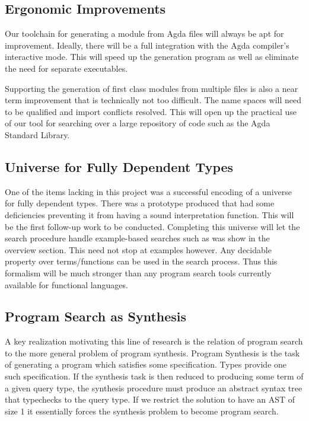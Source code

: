 \documentclass[acmsmall,review,authorversion]{acmart}
\newcommand{\?}{\stackrel{?}{\approx}}
\begin{document}
\subsection{Ergonomic Improvements}

Our toolchain for generating a module from Agda files will always be apt for
improvement. Ideally, there will be a full integration with the Agda compiler's
interactive mode. This will speed up the generation program as well as eliminate
the need for separate executables.

Supporting the generation of first class modules from multiple files is also a
near term improvement that is technically not too difficult. The name spaces
will need to be qualified and import conflicts resolved. This will open up the
practical use of our tool for searching over a large repository of code such as
the Agda Standard Library.\cite{bove2009brief} 


\subsection{Universe for Fully Dependent Types}

One of the items lacking in this project was a successful encoding of a universe
for fully dependent types. There was a prototype produced that had some
deficiencies preventing it from having a sound interpretation function. This
will be the first follow-up work to be conducted. Completing this universe will
let the search procedure handle example-based searches such as was show in the
overview section. This need not stop at examples however. Any decidable property
over terms/functions can be used in the search process. Thus this formalism will
be much stronger than any program search tools currently available for
functional languages.

\subsection{Program Search as Synthesis}

A key realization motivating this line of research is the relation of program
search to the more general problem of program synthesis. Program Synthesis is
the task of generating a program which satisfies some specification. Types
provide one such specification. If the synthesis task is then reduced to
producing some term of a given query type, the synthesis procedure must produce
an abstract syntax tree that typechecks to the query type. If we restrict the
solution to have an AST of size 1 it essentially forces the synthesis problem to
become program search.
\end{document}
